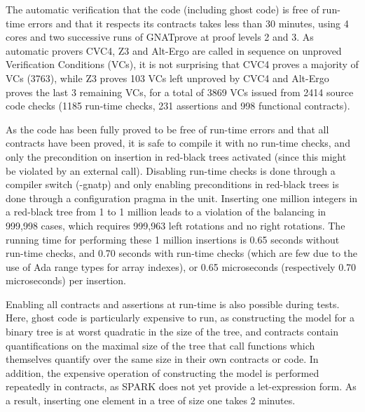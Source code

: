 \documentclass{llncs}
\begin{document}
The automatic verification that the code (including ghost code) is free of
run-time errors and that it respects its contracts takes less than 30 minutes,
using 4 cores and two successive runs
of GNATprove at proof levels 2 and 3. As automatic provers CVC4, Z3 and
Alt-Ergo are called in sequence on unproved Verification Conditions (VCs), it
is not surprising that CVC4 proves a majority of VCs (3763), while Z3 proves
103 VCs left unproved by CVC4 and Alt-Ergo proves the last 3 remaining VCs, for
a total of 3869 VCs issued from 2414 source code checks (1185 run-time checks,
231 assertions and 998 functional contracts).

As the code has been fully proved to be free of run-time errors and that all
contracts have been proved, it is safe to compile it with no run-time checks,
and only the precondition on insertion in red-black trees activated (since this
might be violated by an external call). Disabling run-time checks is done
through a compiler switch (-gnatp) and only enabling preconditions in red-black
trees is done through a configuration pragma in the unit. Inserting one million
integers in a red-black tree from 1 to 1 million leads to a violation of the
balancing in 999,998 cases, which requires 999,963 left rotations and no
right rotations. The running time for
performing these 1 million insertions is 0.65 seconds without run-time checks,
and 0.70 seconds with run-time checks (which are few due to the use of Ada
range types for array indexes), or 0.65 microseconds (respectively 0.70
microseconds) per insertion.

Enabling all contracts and assertions at run-time is also possible during
tests. Here, ghost code is particularly expensive to run, as constructing the
model for a binary tree is at worst quadratic in the size of the tree, and
contracts contain quantifications on the maximal size of the tree that call
functions which themselves quantify over the same size in their own contracts
or code. In addition, the expensive operation of constructing the model is
performed repeatedly in contracts, as SPARK does not yet provide a
let-expression form.  As a result, inserting one element in a tree of size one
takes 2 minutes.
\end{document}
